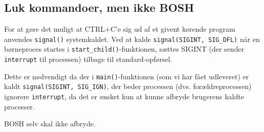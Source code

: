 \subsection{Luk kommandoer, men ikke BOSH}
For at gøre det muligt at CTRL+C'e sig ud af et givent kørende program anvendes \verb+signal()+ systemkaldet. Ved at kalde \verb+signal(SIGINT, SIG_DFL)+ når en børneproces startes i \verb+start_child()+-funktionen, sættes SIGINT (der sender \verb+interrupt+ til processen) tilbage til standard-opførsel.

Dette er nødvendigt da der i \verb+main()+-funktionen (som vi har fået udleveret) er kaldt \verb+signal(SIGINT, SIG_IGN)+, der beder processen (dvs. forældreprocessen) ignorere \verb+interrupt+, da det er ønsket kun at kunne afbryde brugerens kaldte processer. 

BOSH selv skal ikke afbryde.
